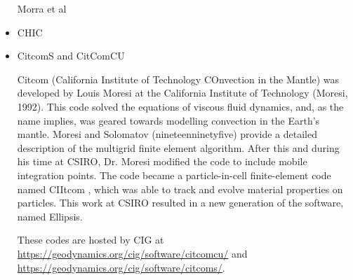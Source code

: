 \begin{itemize}
\begin{scriptsize}
\cite{crsr83}
\cite{katl95}
\cite{moct07}
\cite{moct09}
Morra et al \cite{moyb10}\\
\cite{qumm12}\cite{buqm12}
\cite{quhm13}
\cite{gert19}
\end{scriptsize}

\item {\codefont CHIC}  

\begin{scriptsize}
\cite{norv15}
\end{scriptsize}

\item {\codefont CitcomS} and {\codefont CitComCU} 

Citcom (California Institute of Technology COnvection in the Mantle) was  developed by Louis
Moresi at the California Institute of Technology (Moresi, 1992). This code solved the equations
of viscous fluid dynamics, and, as the name implies, was geared towards modelling convection in
the Earth’s mantle. Moresi and Solomatov (nineteenninetyfive) provide a detailed description of the multigrid
finite element algorithm. After this and during his time at CSIRO, Dr. Moresi modified the code to
include mobile integration points. The code became a particle-in-cell finite-element code named
CIItcom , which was able to track and evolve material properties on particles. This work at
CSIRO resulted in a new generation of the software, named Ellipsis.

These codes are hosted by CIG at\\
\url{https://geodynamics.org/cig/software/citcomcu/} and \\
\url{https://geodynamics.org/cig/software/citcoms/}.


\end{itemize}

